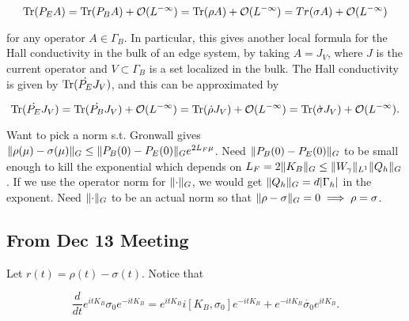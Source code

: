 \documentclass[12pt, letterpaper]{article}
\begin{document}
\[\text{Tr}(P_E A) = \text{Tr}(P_B A) + \mathcal{O}(L^{-\infty}) = \text{Tr}(\rho A) + \mathcal{O}(L^{-\infty}) = Tr(\sigma A) + \mathcal{O}(L^{-\infty}) \]

for any operator $A\in\Gamma_B$. In particular, this gives another local formula for the Hall conductivity in the bulk of an edge system, by taking $A = J_V$, where $J$ is the current operator and $V \subset \Gamma_B$ is a set localized in the bulk. The Hall conductivity is given by $\text{Tr}(\dot{P_E}J_V)$, and this can be approximated by

\[\text{Tr}(\dot{P_E} J_V) = \text{Tr}(\dot{P_B} J_V) + \mathcal{O}(L^{-\infty}) = \text{Tr}(\dot{\rho} J_V) + \mathcal{O}(L^{-\infty}) = \text{Tr}(\dot{\sigma} J_V) + \mathcal{O}(L^{-\infty}).\]

Want to pick a norm s.t. Gronwall gives $\lVert \rho(\mu)-\sigma(\mu) \rVert_G \leq \lVert P_B(0)-P_E(0) \rVert_Ge^{2L_F\mu}$. Need $\lVert P_B(0)-P_E(0) \rVert_G$ to be small enough to kill the exponential which depends on $L_F = 2\lVert K_B \rVert_G \leq \lVert W_\gamma \rVert_{L^1}\lVert Q_h \rVert_G$. If we use the operator norm for $\lVert \cdot \rVert_G$, we would get $\lVert Q_h \rVert_G = d|\Gamma_h|$ in the exponent. Need $\lVert \cdot \rVert_G$ to be an actual norm so that $\lVert \rho-\sigma \rVert_G = 0 \implies \rho = \sigma$.

\subsection*{From Dec 13 Meeting}

Let $r(t) = \rho(t)-\sigma(t)$. Notice that 

\[\frac{d}{dt} e^{itK_B}\sigma_0e^{-itK_B} = e^{itK_B}i[K_B,\sigma_0]e^{-itK_B} + e^{-itK_B}\dot{\sigma_0}e^{itK_B}.\]
\end{document}

